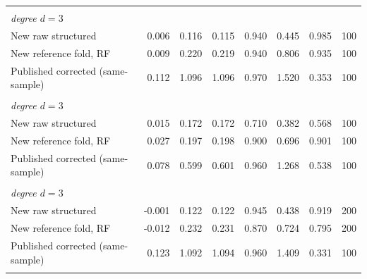 {\begin{longtable}{lrrrrrrr}
\addlinespace
\multicolumn{8}{l}{\textit{baseline}} \\
\multicolumn{8}{l}{\textit{degree $d=3$}} \\
\quad New raw structured & 0.006 & 0.116 & 0.115 & 0.940 & 0.445 & 0.985 & 100 \\
\quad New reference fold, RF & 0.009 & 0.220 & 0.219 & 0.940 & 0.806 & 0.935 & 100 \\
\quad Published corrected (same-sample) & 0.112 & 1.096 & 1.096 & 0.970 & 1.520 & 0.353 & 100 \\
\addlinespace
\multicolumn{8}{l}{\textit{serial}} \\
\multicolumn{8}{l}{\textit{degree $d=3$}} \\
\quad New raw structured & 0.015 & 0.172 & 0.172 & 0.710 & 0.382 & 0.568 & 100 \\
\quad New reference fold, RF & 0.027 & 0.197 & 0.198 & 0.900 & 0.696 & 0.901 & 100 \\
\quad Published corrected (same-sample) & 0.078 & 0.599 & 0.601 & 0.960 & 1.268 & 0.538 & 100 \\
\addlinespace
\multicolumn{8}{l}{\textit{null}} \\
\multicolumn{8}{l}{\textit{degree $d=3$}} \\
\quad New raw structured & -0.001 & 0.122 & 0.122 & 0.945 & 0.438 & 0.919 & 200 \\
\quad New reference fold, RF & -0.012 & 0.232 & 0.231 & 0.870 & 0.724 & 0.795 & 200 \\
\quad Published corrected (same-sample) & 0.123 & 1.092 & 1.094 & 0.960 & 1.409 & 0.331 & 100 \\
\addlinespace
\end{longtable}
}
